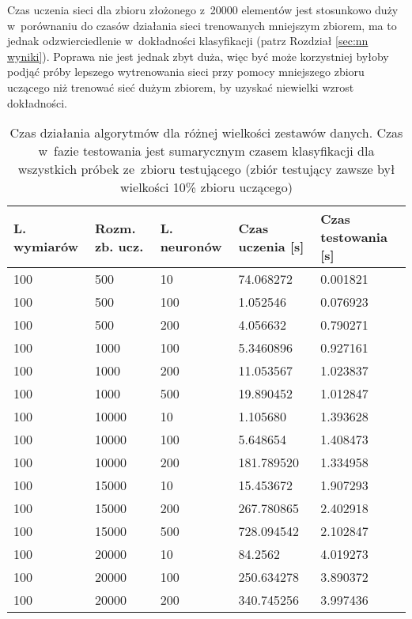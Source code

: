\documentclass[12pt]{article}
\begin{document}
Czas uczenia sieci dla zbioru złożonego z~20000 elementów jest stosunkowo duży w~porównaniu do czasów działania sieci trenowanych mniejszym zbiorem, ma to jednak odzwierciedlenie w~dokładności klasyfikacji (patrz Rozdział \ref{sec:nn wyniki}).
Poprawa nie jest jednak zbyt duża, więc być może korzystniej byłoby podjąć próby lepszego wytrenowania sieci przy pomocy mniejszego zbioru uczącego niż trenować sieć dużym zbiorem, by uzyskać niewielki wzrost dokładności.

\begin{table}[H]
\begin{center}
  \begin{tabular}[H]{|l|l|l|l|l|}
  \hline 
  \rowcolor[gray]{0.9}L. wymiarów & Rozm. zb. ucz. & L. neuronów & Czas uczenia [s] & Czas testowania [s]  \\ \hline \hline

  100    &     500  & 10  & 74.068272 & 0.001821 \\ \hline 
100  &       500 & 100    &  1.052546 & 0.076923 \\ \hline 
100   &      500 & 200    &   4.056632 & 0.790271 \\ \hline 
\hline
100   &      1000&100   &   5.3460896 & 0.927161\\ \hline 
100    &     1000&200 &   11.053567 & 1.023837 \\ \hline 
100     &    1000&500 &      19.890452 & 1.012847\\ \hline 
\hline
100 &        10000  &10&   1.105680  & 1.393628\\ \hline 
100  &       10000   &100&         5.648654 & 1.408473\\ \hline 
100   &      10000   &200&       181.789520 & 1.334958\\ \hline 
\hline
100 &        15000   &10&       15.453672 & 1.907293\\ \hline 
100  &       15000   &200&        267.780865 & 2.402918 \\ \hline 
100   &      15000   &500&       728.094542 & 2.102847\\ \hline 
\hline
100 &        20000   &10&          84.2562 & 4.019273\\ \hline 
100  &       20000   &100&         250.634278 & 3.890372\\ \hline 
100   &      20000   &200&       340.745256 & 3.997436\\ \hline 

  \end{tabular} 
\end{center}
 \caption{Czas działania algorytmów dla różnej wielkości zestawów danych. Czas w~fazie testowania jest sumarycznym czasem klasyfikacji dla wszystkich próbek ze~zbioru testującego (zbiór testujący zawsze był wielkości 10\% zbioru uczącego)} 
\label{tab:czas nn}
\end{table}
\end{document}
